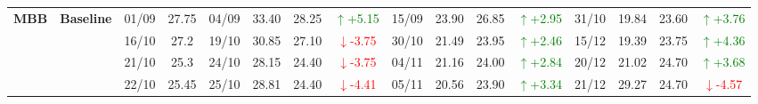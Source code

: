 {\begin{longtable}{llcc|cccc|cccc|cccc}
\multirow{4}{*}{\textbf{MBB}}
& \textbf{Baseline}
& 01/09 & 27.75 & 04/09 & 33.40 & 28.25 & \textcolor{green}{\(\uparrow\)+5.15} & 15/09 & 23.90 & 26.85 & \textcolor{green}{\(\uparrow\)+2.95} & 31/10 & 19.84 & 23.60 & \textcolor{green}{\(\uparrow\)+3.76} \\
& & 16/10 & 27.2 & 19/10 & 30.85 & 27.10 & \textcolor{red}{\(\downarrow\)-3.75} & 30/10 & 21.49 & 23.95 & \textcolor{green}{\(\uparrow\)+2.46} & 15/12 & 19.39 & 23.75 & \textcolor{green}{\(\uparrow\)+4.36} \\
& & 21/10 & 25.3 & 24/10 & 28.15 & 24.40 & \textcolor{red}{\(\downarrow\)-3.75} & 04/11 & 21.16 & 24.00 & \textcolor{green}{\(\uparrow\)+2.84} & 20/12 & 21.02 & 24.70 & \textcolor{green}{\(\uparrow\)+3.68} \\
& & 22/10 & 25.45 & 25/10 & 28.81 & 24.40 & \textcolor{red}{\(\downarrow\)-4.41} & 05/11 & 20.56 & 23.90 & \textcolor{green}{\(\uparrow\)+3.34} & 21/12 & 29.27 & 24.70 & \textcolor{red}{\(\downarrow\)-4.57} \\
\midrule

\end{longtable}
}